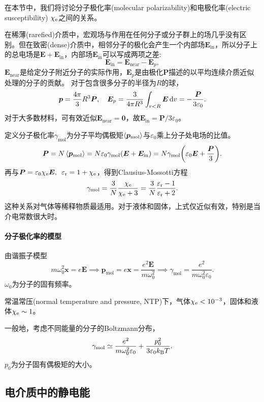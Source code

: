 在本节中，我们将讨论分子极化率(molecular polarizability)和电极化率(electric susceptibility) $\chi_\mathrm e$之间的关系。%

在稀薄(rarefied)介质中，宏观场与作用在任何分子或分子群上的场几乎没有区别。但在致密(dense)介质中，相邻分子的极化会产生一个内部场$\bm E_\text{in}$，所以分子上的总电场是$\bm E+\bm E_\text{in}$，内部场$\bm E_\text{in}$可以写成两项之差:
\[
    \bm E_\text{in}=\bm E_\text{near}-\bm E_p,
\]
$\bm E_\text{near}$是给定分子附近分子的实际作用，$\bm E_p$是由极化$\bm P$描述的以平均连续介质近似处理的分子的贡献。
对于包含很多分子的半径为$R$的球， 
\[
    \bm p=\frac{4\pi}3R^3\bm P,\quad \bm E_p=\frac3{4\pi R^3}\int_{r<R}\bm E\mathop{}\!\mathrm{d} v=-\frac{\bm P}{3\varepsilon_0}.
\]
对于大多数材料，可有效近似$\bm E_\text{near}=\bm 0$，故$\bm E_\text{in}=\bm P/3\varepsilon_0$。

定义分子极化率$\gamma_\text{mol}$为分子平均偶极矩$\left\langle \bm p_\text{mol}\right\rangle$与$\varepsilon_0$乘上分子处电场的比值。
\[
    \bm P=N\left\langle \bm p_\text{mol}\right\rangle=N\varepsilon_0\gamma_\text{mol}(\bm E+\bm E_\text{in})=N\gamma_\text{mol}\biggl(\varepsilon_0\bm E+\frac{\bm P}3\biggr).
\]
再与$\bm P=\varepsilon_0\chi_\mathrm e\bm E,\enspace\varepsilon_\text r=1+\chi_\mathrm e$，得到Clausius-Mossotti方程
\begin{equation}
    \gamma_\text{mol}=\frac3N\frac{\chi_\mathrm e}{\chi_\mathrm e+3}=\frac3N\frac{\varepsilon_\text r-1}{\varepsilon_\text r+2}.
\end{equation}
这种关系对气体等稀释物质最适用。对于液体和固体，上式仅近似有效，特别是当介电常数很大时。
\paragraph{分子极化率的模型}
由谐振子模型
\[
    m\omega_0^2\bm x=e\bm E\implies\bm p_\text{mol}=e\bm x=\frac{e^2\bm E}{m\omega_0^2}\implies\gamma_\text{mol}=\frac{e^2}{m\omega_0^2\varepsilon_0}.
\]
$\omega_0$为分子的固有频率。

常温常压(normal temperature and pressure, NTP)下，气体$\chi_\mathrm e<10^{-3}$，固体和液体$\chi_\mathrm e\sim 1$。

一般地，考虑不同能量的分子的Boltzmann分布，
\[
    \gamma_\text{mol}\simeq\frac{e^2}{m\omega_0^2\varepsilon_0}+\frac{p_0^2}{3\varepsilon_0k_{\mathrm B} T}.
\]
$p_0$为分子固有偶极矩的大小。

\subsection{电介质中的静电能}
\label{ssec:electrostatic energy in dielectric media}

